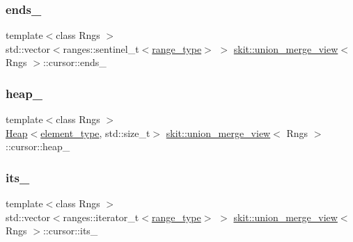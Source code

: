 \subsubsection{\texorpdfstring{ends\+\_\+}{ends\_}}
{\footnotesize\ttfamily template$<$class Rngs $>$ \\
std\+::vector$<$ranges\+::sentinel\+\_\+t$<$\hyperlink{structskit_1_1union__merge__view_1_1cursor_aca3870894a5b4e031b79496118e9ca60}{range\+\_\+type}$>$ $>$ \hyperlink{classskit_1_1union__merge__view}{skit\+::union\+\_\+merge\+\_\+view}$<$ Rngs $>$\+::cursor\+::ends\+\_\+}

\mbox{\label{structskit_1_1union__merge__view_1_1cursor_af93f22ffb1adb0fc7ca2f600f2b891a8}} 
\subsubsection{\texorpdfstring{heap\+\_\+}{heap\_}}
{\footnotesize\ttfamily template$<$class Rngs $>$ \\
\hyperlink{classskit_1_1Heap}{Heap}$<$\hyperlink{structskit_1_1union__merge__view_1_1cursor_acb2065245b1bc94caf985a6500636d27}{element\+\_\+type}, std\+::size\+\_\+t$>$ \hyperlink{classskit_1_1union__merge__view}{skit\+::union\+\_\+merge\+\_\+view}$<$ Rngs $>$\+::cursor\+::heap\+\_\+}

\mbox{\label{structskit_1_1union__merge__view_1_1cursor_af4cdaba15091dfb47ab397ddb13eea45}} 
\subsubsection{\texorpdfstring{its\+\_\+}{its\_}}
{\footnotesize\ttfamily template$<$class Rngs $>$ \\
std\+::vector$<$ranges\+::iterator\+\_\+t$<$\hyperlink{structskit_1_1union__merge__view_1_1cursor_aca3870894a5b4e031b79496118e9ca60}{range\+\_\+type}$>$ $>$ \hyperlink{classskit_1_1union__merge__view}{skit\+::union\+\_\+merge\+\_\+view}$<$ Rngs $>$\+::cursor\+::its\+\_\+}

